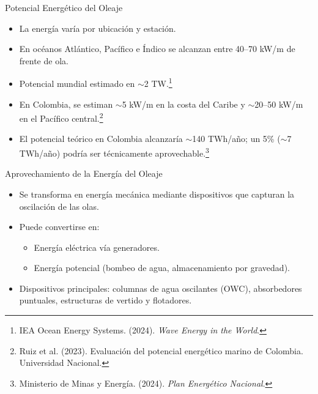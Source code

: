 \documentclass[main.tex]{subfiles}
\begin{document}
\begin{frame}{Potencial Energético del Oleaje}
    \begin{itemize}
        \item La energía varía por ubicación y estación.
        \item En océanos Atlántico, Pacífico e Índico se alcanzan entre 40–70 kW/m de frente de ola.
        \item Potencial mundial estimado en $\sim$2 TW.\footnote{IEA Ocean Energy Systems. (2024). \textit{Wave Energy in the World}.}
        \item En Colombia, se estiman $\sim$5 kW/m en la costa del Caribe y $\sim$20–50 kW/m en el Pacífico central.\footnote{Ruiz et al. (2023). Evaluación del potencial energético marino de Colombia. Universidad Nacional.}
        \item El potencial teórico en Colombia alcanzaría $\sim$140 TWh/año; un 5\% ($\sim$7 TWh/año) podría ser técnicamente aprovechable.\footnote{Ministerio de Minas y Energía. (2024). \textit{Plan Energético Nacional}.}
    \end{itemize}
\end{frame}



\begin{frame}{Aprovechamiento de la Energía del Oleaje}
    \begin{itemize}
        \item Se transforma en energía mecánica mediante dispositivos que capturan la oscilación de las olas.
        \item Puede convertirse en:
        \begin{itemize}
            \item Energía eléctrica vía generadores.
            \item Energía potencial (bombeo de agua, almacenamiento por gravedad).
        \end{itemize}
        \item Dispositivos principales: columnas de agua oscilantes (OWC), absorbedores puntuales, estructuras de vertido y flotadores.
    \end{itemize}
\end{frame}
\end{document}
